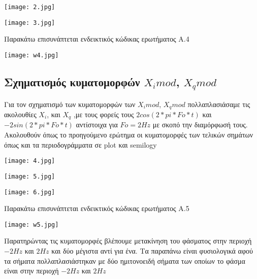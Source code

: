 \documentclass[11pt]{article}
\newcommand{\np}{\newpage}	%
\begin{document}
\begin{center}
	\texttt{[image: 2.jpg]}
\end{center}

\begin{center}
	\texttt{[image: 3.jpg]}
\end{center}
\hfill

Παρακάτω επισυνάπτεται ενδεικτικός κώδικας ερωτήματος Α.4
\begin{center}
	\texttt{[image: w4.jpg]}
\end{center}
\np

\subsection{Σχηματισμός κυματομορφών $X_imod$, $X_qmod$}

Για τον σχηματισμό των κυματομορφών των $X_imod$, $X_qmod$ πολλαπλασιάσαμε τις ακολουθίες $X_i$,  και $X_q$ ,με τους φορείς τους $2cos(2*pi*Fo*t)$ και $-2sin(2*pi*Fo*t)$ αντίστοιχα για $Fo =2Hz$ με σκοπό την διαμόρφωσή τους. Ακολουθούν όπως το προηγούμενο ερώτημα οι κυματομορφές των τελικών σημάτων όπως και τα περιοδογράμματα σε \foreignlanguage{english}{plot} και \foreignlanguage{english}{semilogy}

\begin{center}
	\texttt{[image: 4.jpg]}
\end{center}

\begin{center}
	\texttt{[image: 5.jpg]}
\end{center}

\begin{center}
	\texttt{[image: 6.jpg]}
\end{center}
\hfill

Παρακάτω επισυνάπτεται ενδεικτικός κώδικας ερωτήματος Α.5
\begin{center}
	\texttt{[image: w5.jpg]}
\end{center}
Παρατηρώντας τις κυματομορφές βλέπουμε μετακίνηση του φάσματος στην περιοχή $-2Hz$ και $2Hz$ και δύο μέγιστα αντί για ένα. Τα παραπάνω είναι φυσιολογικά αφού τα σήματα πολλαπλασιάστηκαν με δύο ημιτονοειδή σήματα των οποίων το φάσμα είναι στην περιοχή $-2Hz$ και $2Hz$
\np
\end{document}
